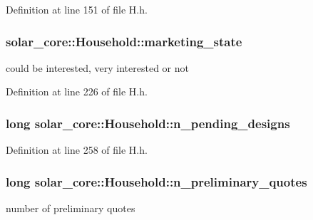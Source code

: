Definition at line 151 of file H.\+h.

\hypertarget{classsolar__core_1_1_household_a3ee8b2654cad46236d11f85a4ccd9574}{}
\subsubsection[{marketing\+\_\+state}]{ solar\+\_\+core\+::\+Household\+::marketing\+\_\+state\hspace{0.3cm}{\ttfamily [protected]}}\label{classsolar__core_1_1_household_a3ee8b2654cad46236d11f85a4ccd9574}
could be interested, very interested or not 

Definition at line 226 of file H.\+h.

\hypertarget{classsolar__core_1_1_household_ac82a6ebca38ecaf971845f6fa5791559}{}
\subsubsection[{n\+\_\+pending\+\_\+designs}]{\setlength{\rightskip}{0pt plus 5cm}long solar\+\_\+core\+::\+Household\+::n\+\_\+pending\+\_\+designs\hspace{0.3cm}{\ttfamily [protected]}}\label{classsolar__core_1_1_household_ac82a6ebca38ecaf971845f6fa5791559}


Definition at line 258 of file H.\+h.

\hypertarget{classsolar__core_1_1_household_aedfc08b7837a3e2fa6ad9e62309694f3}{}
\subsubsection[{n\+\_\+preliminary\+\_\+quotes}]{\setlength{\rightskip}{0pt plus 5cm}long solar\+\_\+core\+::\+Household\+::n\+\_\+preliminary\+\_\+quotes\hspace{0.3cm}{\ttfamily [protected]}}\label{classsolar__core_1_1_household_aedfc08b7837a3e2fa6ad9e62309694f3}
number of preliminary quotes 

